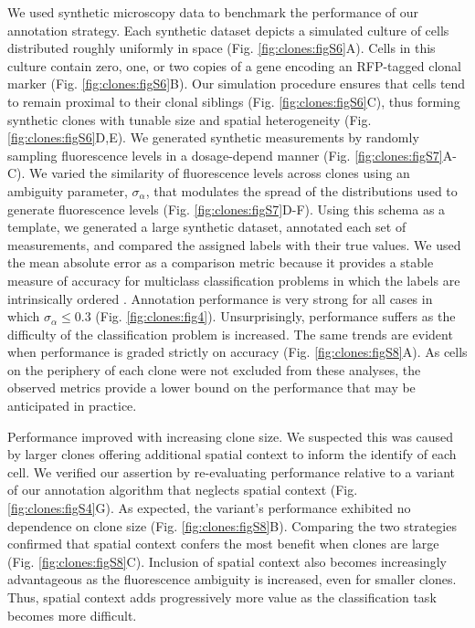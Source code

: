 We used synthetic microscopy data to benchmark the performance of our annotation strategy. Each synthetic dataset depicts a simulated culture of cells distributed roughly uniformly in space (Fig. \ref{fig:clones:figS6}A). Cells in this culture contain zero, one, or two copies of a gene encoding an RFP-tagged clonal marker (Fig. \ref{fig:clones:figS6}B). Our simulation procedure ensures that cells tend to remain proximal to their clonal siblings (Fig. \ref{fig:clones:figS6}C), thus forming synthetic clones with tunable size and spatial heterogeneity (Fig. \ref{fig:clones:figS6}D,E). We generated synthetic measurements by randomly sampling fluorescence levels in a dosage-depend manner (Fig. \ref{fig:clones:figS7}A-C). We varied the similarity of fluorescence levels across clones using an ambiguity parameter, $\sigma_{\alpha}$, that modulates the spread of the distributions used to generate fluorescence levels (Fig. \ref{fig:clones:figS7}D-F). Using this schema as a template, we generated a large synthetic dataset, annotated each set of measurements, and compared the assigned labels with their true values. We used the mean absolute error as a comparison metric because it provides a stable measure of accuracy for multiclass classification problems in which the labels are intrinsically ordered \cite{Gaudette2009}. Annotation performance is very strong for all cases in which $\sigma_{\alpha} \leq 0.3$ (Fig. \ref{fig:clones:fig4}). Unsurprisingly, performance suffers as the difficulty of the classification problem is increased. The same trends are evident when performance is graded strictly on accuracy (Fig. \ref{fig:clones:figS8}A). As cells on the periphery of each clone were not excluded from these analyses, the observed metrics provide a lower bound on the performance that may be anticipated in practice. 

Performance improved with increasing clone size. We suspected this was caused by larger clones offering additional spatial context to inform the identify of each cell. We verified our assertion by re-evaluating performance relative to a variant of our annotation algorithm that neglects spatial context (Fig. \ref{fig:clones:figS4}G). As expected, the variant's performance exhibited no dependence on clone size (Fig. \ref{fig:clones:figS8}B). Comparing the two strategies confirmed that spatial context confers the most benefit when clones are large (Fig. \ref{fig:clones:figS8}C). Inclusion of spatial context also becomes increasingly advantageous as the fluorescence ambiguity is increased, even for smaller clones. Thus, spatial context adds progressively more value as the classification task becomes more difficult.

